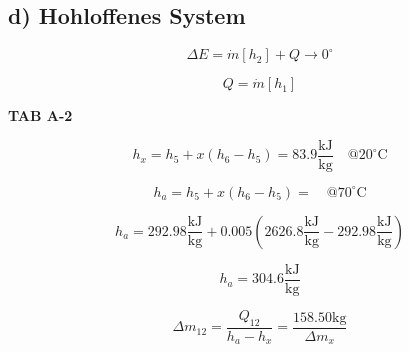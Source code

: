 \subsection*{d) Hohloffenes System}

\[
\Delta E = \dot{m} [h_2] + Q \rightarrow 0^\circ
\]

\[
Q = \dot{m} [h_1]
\]

\textbf{TAB A-2}

\[
h_{x} = h_{5} + x (h_{6} - h_{5}) = 83.9 \frac{\text{kJ}}{\text{kg}} \quad @ 20^\circ \text{C}
\]

\[
h_{a} = h_{5} + x (h_{6} - h_{5}) = \quad @ 70^\circ \text{C}
\]

\[
h_{a} = 292.98 \frac{\text{kJ}}{\text{kg}} + 0.005 \left( 2626.8 \frac{\text{kJ}}{\text{kg}} - 292.98 \frac{\text{kJ}}{\text{kg}} \right)
\]

\[
h_{a} = 304.6 \frac{\text{kJ}}{\text{kg}}
\]

\[
\Delta m_{12} = \frac{Q_{12}}{h_{a} - h_{x}} = \frac{158.50 \text{kg}}{\Delta m_{x}}
\]